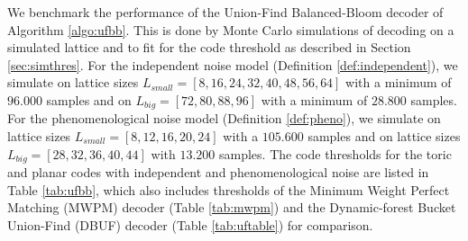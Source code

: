 We benchmark the performance of the Union-Find Balanced-Bloom decoder of Algorithm \ref{algo:ufbb}. This is done by Monte Carlo simulations of decoding on a simulated lattice and to fit for the code threshold as described in Section \ref{sec:simthres}. For the independent noise model (Definition \ref{def:independent}), we simulate on lattice sizes $L_{small}=[8, 16, 24, 32, 40, 48, 56, 64]$ with a minimum of $96.000$ samples and on $L_{big}=[72, 80, 88, 96]$ with a minimum of $28.800$ samples. For the phenomenological noise model (Definition \ref{def:pheno}), we simulate on lattice sizes $L_{small}=[8,12,16,20,24]$ with a $105.600$ samples and on lattice sizes $L_{big}=[28, 32, 36, 40, 44]$ with $13.200$ samples. The code thresholds for the toric and planar codes with independent and phenomenological noise are listed in Table \ref{tab:ufbb}, which also includes thresholds of the Minimum Weight Perfect Matching (MWPM) decoder (Table \ref{tab:mwpm}) and the Dynamic-forest Bucket Union-Find (DBUF) decoder (Table \ref{tab:uftable}) for comparison.

